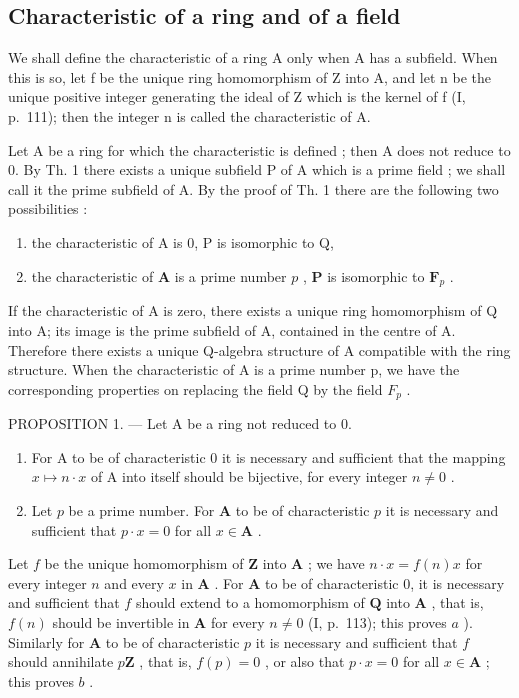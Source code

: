 \subsection{Characteristic of a ring and of a field}

We shall define the characteristic of a ring A only when A has a subfield. When this is so, let f be the unique ring homomorphism of Z into A, and let n be the unique positive integer generating the ideal of Z which is the kernel of f (I, p.~111); then the integer n is called the characteristic of A.

Let A be a ring for which the characteristic is defined ; then A does not reduce to 0. By Th. 1 there exists a unique subfield P of A which is a prime field ; we shall call it the prime subfield of A. By the proof of Th. 1 there are the following two possibilities :

\begin{enumerate}
\def\labelenumi{\alph{enumi})}
\item
  the characteristic of A is 0, P is isomorphic to Q,
\item
  the characteristic of \(\mathbf{A}\) is a prime number \(p\) , \(\mathbf{P}\) is isomorphic to \(\mathbf{F}_p\) .
\end{enumerate}

If the characteristic of A is zero, there exists a unique ring homomorphism of Q into A; its image is the prime subfield of A, contained in the centre of A. Therefore there exists a unique Q-algebra structure of A compatible with the ring structure. When the characteristic of A is a prime number p, we have the corresponding properties on replacing the field Q by the field \(F_{p}\) .

PROPOSITION 1. --- Let A be a ring not reduced to 0.

\begin{enumerate}
\def\labelenumi{\alph{enumi})}
\item
  For A to be of characteristic 0 it is necessary and sufficient that the mapping \(x \mapsto n \cdot x\) of A into itself should be bijective, for every integer \(n \neq 0\) .
\item
  Let \(p\) be a prime number. For \(\mathbf{A}\) to be of characteristic \(p\) it is necessary and sufficient that \(p \cdot x = 0\) for all \(x \in \mathbf{A}\) .
\end{enumerate}

Let \(f\) be the unique homomorphism of \(\mathbf{Z}\) into \(\mathbf{A}\) ; we have \(n \cdot x = f(n)x\) for every integer \(n\) and every \(x\) in \(\mathbf{A}\) . For \(\mathbf{A}\) to be of characteristic 0, it is necessary and sufficient that \(f\) should extend to a homomorphism of \(\mathbf{Q}\) into \(\mathbf{A}\) , that is, \(f(n)\) should be invertible in \(\mathbf{A}\) for every \(n \neq 0\) (I, p.~113); this proves \(a\) ). Similarly for \(\mathbf{A}\) to be of characteristic \(p\) it is necessary and sufficient that \(f\) should annihilate \(p\mathbf{Z}\) , that is, \(f(p) = 0\) , or also that \(p \cdot x = 0\) for all \(x \in \mathbf{A}\) ; this proves \(b\) .

